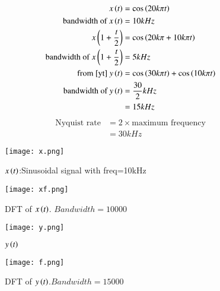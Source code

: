 \documentclass[journal,12pt,twocolumn]{IEEEtran}
\begin{document}
\begin{align}
  x\left(t\right)&=\cos{\ensuremath{\left(20k\pi t\right)}}\\
    \text{bandwidth of } x\left(t\right) &= 10 kHz\\
    x\left(1+\frac{t}{2}\right) &= \cos{\ensuremath{\left(20k\pi+10k\pi t\right)}}\\
    \text{bandwidth of } x\left(1+\frac{t}{2}\right) &=  5 kHz\\
    \text{from \eqref{yt} } 
    y\left(t\right)&= \cos{\ensuremath{\left(30k\pi t\right)}}+\cos{\ensuremath{\left(10k\pi t\right)}}\\
    \text{bandwidth of } y\left(t\right) &= \frac{30}{2} kHz\\
    &= 15 kHz
\end{align}
\begin{align}
    \text{Nyquist rate} &= 2 \times \text{maximum frequency}\\
    &= 30 kHz
\end{align}
\begin{figure}[!h]
 \centering
 \texttt{[image: x.png]}
 \caption{$x\left(t\right)$:Sinusoidal signal with freq=10kHz}
\end{figure}
\begin{figure}[!h]
 \centering
 \texttt{[image: xf.png]}
 \caption{DFT of $x\left(t\right)$. $Bandwidth=10000$}
\end{figure}
\begin{figure}[!h]
 \centering
 \texttt{[image: y.png]}
 \caption{$y\left(t\right)$}
\end{figure}
\begin{figure}[!h]
 \centering
 \texttt{[image: f.png]}
 \caption{DFT of $y\left(t\right)$.$Bandwidth=15000$}
\end{figure}
\end{document}
